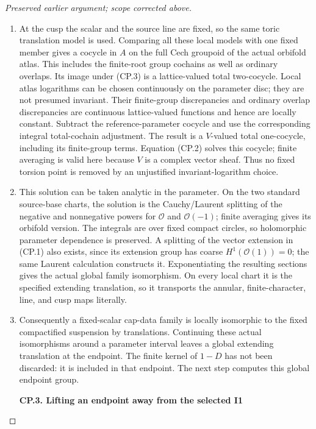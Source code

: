 \begin{proof}[Preserved earlier argument; scope corrected above]
\begin{enumerate}[label=\arabic*.]
\item At the cusp the scalar and the source line are fixed, so the same
toric translation model is used. Comparing all these local models
with one fixed member gives a cocycle in \(A\) on the full Cech
groupoid of the actual orbifold atlas. This includes the finite-root
group cochains as well as ordinary overlaps. Its image under (CP.3)
is a lattice-valued total two-cocycle. Local atlas logarithms can be
chosen continuously on the parameter disc; they are not presumed
invariant. Their finite-group discrepancies and ordinary overlap
discrepancies are continuous lattice-valued functions and hence are
locally constant. Subtract the reference-parameter cocycle and use
the corresponding integral total-cochain adjustment. The result is
a \(V\)-valued total one-cocycle, including its finite-group terms.
Equation (CP.2) solves this cocycle; finite averaging is valid here
because \(V\) is a complex vector sheaf. Thus no fixed torsion point is
removed by an unjustified invariant-logarithm choice.

\item This solution can be taken analytic in the parameter. On the two
standard source-base charts, the solution is the Cauchy/Laurent
splitting of the negative and nonnegative powers for \(\mathcal O\) and \(\mathcal O(-1)\);
finite averaging gives its orbifold version. The integrals are over
fixed compact circles, so holomorphic parameter dependence is
preserved. A splitting of the vector extension in (CP.1) also exists,
since its extension group has coarse \(H^1(\mathcal O(1))=0\); the same Laurent
calculation constructs it. Exponentiating the resulting sections
gives the actual global family isomorphism. On every local chart it
is the specified extending translation, so it transports the
annular, finite-character, line, and cusp maps literally.

\item Consequently a fixed-scalar cap-data family is locally isomorphic to
the fixed compactified suspension by translations. Continuing these
actual isomorphisms around a parameter interval leaves a global
extending translation at the endpoint. The finite kernel of \(1-D\)
has not been discarded: it is included in that endpoint. The next
step computes this global endpoint group.

\par

\medskip\noindent\textbf{CP.3. Lifting an endpoint away from the selected I1}

\par\nobreak


\end{enumerate}
\end{proof}
